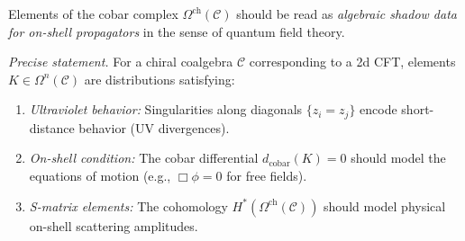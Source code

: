 \begin{conjecture}\label{conj:cobar-physical}
Elements of the cobar complex $\Omega^{\text{ch}}(\mathcal{C})$ should be read as
\emph{algebraic shadow data for on-shell propagators} in the sense of quantum
field theory.

\emph{Precise statement.} For a chiral coalgebra $\mathcal{C}$ corresponding
to a 2d CFT, elements $K \in \Omega^n(\mathcal{C})$ are distributions satisfying:
\begin{enumerate}
\item \emph{Ultraviolet behavior:} Singularities along diagonals $\{z_i = z_j\}$ 
encode short-distance behavior (UV divergences).
\item \emph{On-shell condition:} The cobar differential $d_{\text{cobar}}(K) = 0$ 
should model the equations of motion (e.g., $\Box \phi = 0$ for free fields).
\item \emph{S-matrix elements:} The cohomology $H^*(\Omega^{\text{ch}}(\mathcal{C}))$ 
should model physical on-shell scattering amplitudes.
\end{enumerate}
\end{conjecture}


